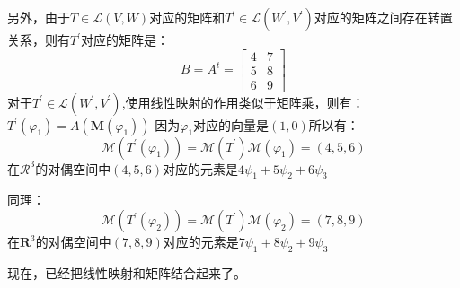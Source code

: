 \documentclass[10pt,a4paper,UTF8]{article}
\begin{document}
\begin{answer}
另外，由于\(T\in \mathcal{L}(V,W)\)对应的矩阵和\(T^{'}\in \mathcal{L}(W^{'},V^{'})\)对应的矩阵之间存在转置关系，则有\(T^{'}\)对应的矩阵是：
\begin{equation}
\label{eq:10}
B=A^{t}=
\begin{bmatrix}
4 & 7 \\
5 & 8 \\
6 & 9
\end{bmatrix}
\end{equation}
对于\(T^{'}\in \mathcal{L}(W^{'},V^{'})\),使用线性映射的作用类似于矩阵乘，则有：
\(T^{'}(\varphi_{1}) = A(\mathbf{M}(\varphi_{1}))\) 因为\(\varphi_{1}\)对应的向量是\((1,0)\)所以有：
\begin{equation}
\label{eq:11}
\mathcal{M}(T^{'}(\varphi_{1})) = \mathcal{M}(T^{'}) \mathcal{M}(\varphi_{1}) = (4,5,6)
\end{equation}
在\(\mathcal{R}^{3}\)的对偶空间中\((4,5,6)\)对应的元素是\(4\psi_{1} + 5\psi_{2} + 6\psi_{3}\)

同理：
\begin{equation}
\label{eq:12}
\mathcal{M}(T^{'}(\varphi_{2})) = \mathcal{M}(T^{'}) \mathcal{M}(\varphi_{2}) = (7,8,9)
\end{equation}
在\(\mathbf{R}^{3}\)的对偶空间中\((7,8,9)\)对应的元素是\(7\psi_{1} + 8\psi_{2} + 9\psi_{3}\)


现在，已经把线性映射和矩阵结合起来了。
\end{answer}
\end{document}
